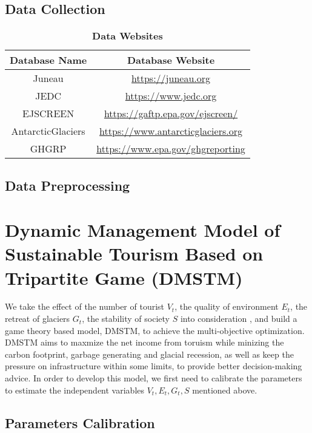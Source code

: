 \documentclass{mcmthesis}
\begin{document}
\subsection{Data Collection}
\begin{table}[H]
  \caption{\textbf{Data Websites}} 
  \centering
  \begin{tabular}{cc}
    \toprule 
      Database Name & Database Website \\
    \midrule
      Juneau & \href{https://juneau.org}{https://juneau.org} \\ 
      JEDC & \href{https://www.jedc.org}{https://www.jedc.org} \\
      EJSCREEN & \href{https://gaftp.epa.gov/ejscreen/}{https://gaftp.epa.gov/ejscreen/} \\ 
      AntarcticGlaciers & \href{https://www.antarcticglaciers.org}{https://www.antarcticglaciers.org} \\
      GHGRP & \href{https://www.epa.gov/ghgreporting}{https://www.epa.gov/ghgreporting} \\
    \bottomrule
  \end{tabular}
\end{table}

\subsection{Data Preprocessing}

\section{Dynamic Management Model of Sustainable Tourism Based on Tripartite Game (DMSTM)}
We take the effect of the number of tourist $V_t$, the quality of environment $E_t$, 
the retreat of glaciers $G_t$, the stability of society $S$ into consideration , 
and build a game theory based model, DMSTM, to achieve the multi-objective optimization.
DMSTM aims to maxmize the net income from toruism while minizing the carbon footprint,
garbage generating and glacial recession, as well as keep the pressure on infrastructure within some limits,
to provide better decision-making advice.
In order to develop this model, we first need to calibrate the parameters to estimate 
the independent variables $V_t, E_t, G_t, S$ mentioned above.

\subsection{Parameters Calibration}
\end{document}
